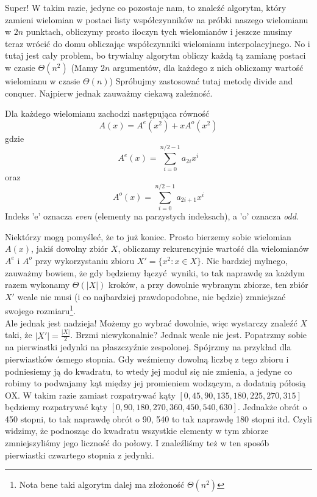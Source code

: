Super! W takim razie, jedyne co pozostaje nam, to znaleźć algorytm, który zamieni wielomian w postaci listy współczynników na próbki naszego wielomianu w $2n$ punktach, obliczymy prosto iloczyn tych wielomianów i jeszcze musimy teraz wrócić do domu obliczając współczynniki wielomianu interpolacyjnego.
No i tutaj jest cały problem, bo trywialny algorytm obliczy każdą tą zamianę postaci w czasie $\Theta(n^2)$ (Mamy $2n$ argumentów, dla każdego z nich obliczamy wartość wielomianu w czasie $\Theta(n)$)
Spróbujmy zastosować tutaj metodę divide and conquer. Najpierw jednak zauważmy ciekawą zależność.

\begin{observation_small}
Dla każdego wielomianu zachodzi następująca równość $$A(x) = A^e(x^2) + xA^o(x^2)$$ gdzie $$A^e(x) = \sum_{i=0}^{n/2 - 1}a_{2i}x^i$$ oraz $$A^o(x) = \sum_{i=0}^{n/2 - 1} a_{2i+1}x^i$$
Indeks 'e' oznacza \textit{even} (elementy na parzystych indeksach), a 'o' oznacza \textit{odd}.
\end{observation_small}
Niektórzy mogą pomyśleć, że to już koniec. Prosto bierzemy sobie wielomian $A(x)$, jakiś dowolny zbiór $X$, obliczamy rekurencyjnie wartość dla wielomianów $A^e$ i $A^o$ przy wykorzystaniu zbioru $X' = \{x^2 : x \in X\}$.
Nic bardziej mylnego, zauważmy bowiem, że gdy będziemy łączyć wyniki, to tak naprawdę za każdym razem wykonamy $\Theta(|X|)$ kroków, a przy dowolnie wybranym zbiorze, ten zbiór $X'$ wcale nie musi (i co najbardziej prawdopodobne, nie będzie) zmniejszać swojego rozmiaru\footnote{Nota bene taki algorytm dalej ma złożoność $\Theta(n^2)$}. \\
Ale jednak jest nadzieja! Możemy go wybrać dowolnie, więc wystarczy znaleźć $X$ taki, że $|X'| = \frac{|X|}{2}$. Brzmi niewykonalnie? Jednak wcale nie jest. Popatrzmy sobie na pierwiastki jedynki na płaszczyźnie zespolonej. Spójrzmy na przykład dla pierwiastków ósmego stopnia.
Gdy weźmiemy dowolną liczbę z tego zbioru i podniesiemy ją do kwadratu, to wtedy jej moduł się nie zmienia, a jedyne co robimy to podwajamy kąt między jej promieniem wodzącym, a dodatnią półosią OX.
W takim razie zamiast rozpatrywać kąty $[0, 45, 90, 135, 180, 225, 270, 315]$ będziemy rozpatrywać kąty $[0, 90, 180, 270, 360, 450, 540, 630]$.
Jednakże obrót o 450 stopni, to tak naprawdę obrót o 90, 540 to tak naprawdę 180 stopni itd.
Czyli widzimy, że podnosząc do kwadratu wszystkie elementy w tym zbiorze zmniejszyliśmy jego liczność do połowy. I znaleźliśmy też w ten sposób pierwiastki czwartego stopnia z jedynki.

